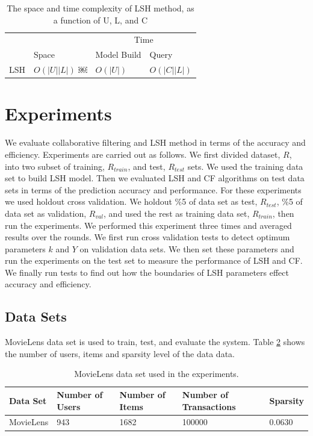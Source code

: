 \documentclass[conference]{IEEEtran}
\begin{document}
\begin{table}
\centering
\begin{tabular}{llll}
\hline
& & \multicolumn {2}{c}{Time} \\
\cline{3-4}
     & Space & Model Build  & Query \\
\hline
LSH & $O(|U||L|)$ ￼& $O(|U|)$ &$O(|C||L|)$ \\
\hline
\end{tabular}
\caption{The space and time complexity of LSH  method, as a function of U, L, and C}
\label{table:complexity-lsh}
\end{table}

\section{Experiments}
\label{sec:experiements}

We evaluate collaborative filtering and LSH method in terms of the accuracy 
and efficiency. Experiments are carried out as follows. We first divided 
dataset, $R$, into two subset of training, $R_{train}$, and test, $R_{test}$ 
sets. We used the training data set to build LSH model. Then we evaluated LSH 
and CF algorithms on test data sets in terms of the prediction accuracy and
performance. For these experiments we used holdout cross validation. We holdout
\%5 of data set as test, $R_{test}$, \%5 of data set as validation, $R_{val}$, 
and used the rest as training data set, $R_{train}$, then run the experiments. 
We performed this experiment three times and averaged results over the rounds. 
We first run cross validation tests to detect optimum parameters $k$ and $Y$ on 
validation data sets. We then set these parameters and run the experiments on 
the test set to measure the performance of LSH and CF. We finally run tests to 
find out how the boundaries of LSH parameters effect accuracy and efficiency. 


\subsection{Data Sets}
MovieLens data set is used to train, test, and evaluate the system. Table 
\ref{table:data-set} shows the number of users, items and sparsity level of 
the data data.

\begin{table}[!ht]
\centering
\begin{tabularx}{0.45\textwidth}{XXXXX}
\hline
Data Set & Number of \newline Users & Number of \newline Items & Number of \newline Transactions & Sparsity \\
\hline
MovieLens     & 943	& 1682	  & 100000   & 0.0630   \\
\hline
\end{tabularx}
\caption{MovieLens data set used in the experiments.}
\label{table:data-set}
\end{table}
\end{document}
